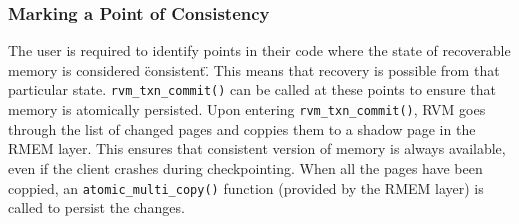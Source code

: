 \subsubsection{Marking a Point of Consistency}
The user is required to identify points in their code where the state of
recoverable memory is considered \"consistent\". This means that recovery is
possible from that particular state. \verb|rvm_txn_commit()| can be called at
these points to ensure that memory is atomically persisted. Upon entering
\verb|rvm_txn_commit()|, RVM goes through the list of changed pages and coppies
them to a shadow page in the RMEM layer. This ensures that consistent version
of memory is always available, even if the client crashes during checkpointing.
When all the pages have been coppied, an \verb|atomic_multi_copy()| function
(provided by the RMEM layer) is called to persist the changes.

